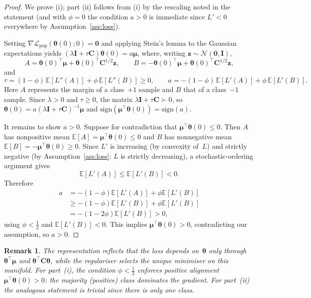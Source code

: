 \documentclass[11pt]{article}
\newcommand{\EE}{\mathbb{E}}
\newcommand{\NN}{\mathcal{N}}
\newcommand{\I}{\mathbf{I}}
\newcommand{\C}{\mathbf{C}}
\newcommand{\bmu}{\boldsymbol{\mu}}
\newcommand{\btheta}{\boldsymbol{\theta}}
\newtheorem{remark}{Remark}
\begin{document}
\begin{proof}
We prove (i); part (ii) follows from (i) by the rescaling noted in the
statement (and with $\phi = 0$ the condition $a > 0$ is immediate since
$L' < 0$ everywhere by Assumption~\ref{ass:loss}).

Setting
$\nabla\mathcal{L}_{\mathrm{pop}}(\btheta(0);0)
= \mathbf{0}$ and applying Stein's lemma to the Gaussian
expectations yields
$(\lambda\I+\tau\C)\btheta(0) = a\bmu$,
where, writing $\mathbf{z} \sim \NN(\mathbf{0},\I)$,
\[
A = \btheta(0)^\top\bmu
+ \btheta(0)^\top\C^{1/2}\mathbf{z},
\qquad
B = -\btheta(0)^\top\bmu
+ \btheta(0)^\top\C^{1/2}\mathbf{z},
\]
and
\[
\tau = (1-\phi)\,\EE[L''(A)] + \phi\,\EE[L''(B)] \geq 0,
\qquad
a = -(1-\phi)\,\EE[L'(A)] + \phi\,\EE[L'(B)].
\]
Here $A$ represents the margin of a class~$+1$ sample and
$B$ that of a class~$-1$ sample.
Since $\lambda > 0$ and $\tau \geq 0$, the matrix
$\lambda\I+\tau\C \succ 0$, so
$\btheta(0) = a(\lambda\I+\tau\C)^{-1}\bmu$
and $\mathrm{sign}(\bmu^\top\btheta(0))
= \mathrm{sign}(a)$.

It remains to show $a > 0$.
Suppose for contradiction that
$\bmu^\top\btheta(0) \leq 0$.
Then $A$ has nonpositive mean
$\EE[A] = \bmu^\top\btheta(0) \leq 0$ and $B$ has
nonnegative mean
$\EE[B] = -\bmu^\top\btheta(0) \geq 0$.
Since $L'$ is increasing (by convexity of~$L$) and strictly negative
(by Assumption~\ref{ass:loss}: $L$ is strictly decreasing),
a stochastic-ordering argument gives
\[
\EE[L'(A)] \leq \EE[L'(B)] < 0.
\]
Therefore
\begin{align*}
a
&= -(1-\phi)\EE[L'(A)] + \phi\EE[L'(B)] \\
&\geq -(1-\phi)\EE[L'(B)] + \phi\EE[L'(B)] \\
&= -(1-2\phi)\EE[L'(B)] > 0,
\end{align*}
using $\phi < \tfrac{1}{2}$ and $\EE[L'(B)] < 0$.
This implies $\bmu^\top\btheta(0) > 0$, contradicting
our assumption, so $a > 0$.
\end{proof}

\begin{remark}
The representation reflects that the loss depends on~$\btheta$ only
through $\btheta^\top\bmu$ and $\btheta^\top\C\btheta$, while the
regulariser selects the unique minimiser on this manifold.
For part~(i), the condition $\phi < \tfrac{1}{2}$ enforces positive
alignment $\bmu^\top\btheta(0) > 0$: the majority (positive) class
dominates the gradient. For part~(ii) the analogous statement is trivial
since there is only one class.
\end{remark}
\end{document}
